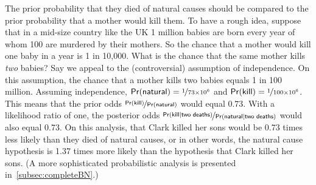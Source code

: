 \documentclass{article}
\newcommand{\pr}{\mathsf{Pr}}
\begin{document}
The prior probability that they died of natural causes 
should be compared to the prior probability that a mother would kill them. %
To have a rough idea, suppose that in a mid-size country like the UK 1 million babies are born every year of whom 100 are murdered by their mothers. So the chance that a mother would kill one baby in a year is 1 in 10,000. What is the chance that the same mother kills \textit{two} babies? Say we appeal to the (controversial) assumption of independence. On this assumption, the chance that a mother kills two babies equals %
1 in 100 million. %
Assuming independence, 
$\pr(\textsf{natural})=\nicefrac{1}{73\times10^6}$ and $\pr(\textsf{kill})=\nicefrac{1}{100\times 10^6}$.
%
This means that the prior odds $\nicefrac{\pr(\textsf{kill})}{\pr(\textsf{natural})}$ would equal $0.73$. 
With a likelihood ratio of one, the posterior 
odds $ \nicefrac{\pr(\textsf{kill} \vert \textsf{two deaths})}{\pr(\textsf{natural} \vert \textsf{two deaths})}$ would also equal 0.73. On this analysis, that Clark killed her sons would be 0.73 times less likely than they died of natural causes, or in other words, the natural cause hypothesis is 1.37 times more likely than the hypothesis that Clark killed her sons. 
(A more sophisticated probabilistic analysis is presented in~\ref{subsec:completeBN}.)


%
\end{document}
